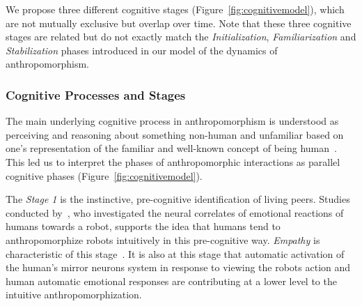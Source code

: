 \documentclass{frontiersSCNS} %
\begin{document}
We propose three different cognitive stages (Figure~\ref{fig:cognitivemodel}),
which are not mutually exclusive but overlap over time. Note that these three
cognitive stages are related but do not exactly match the \emph{Initialization},
\emph{Familiarization} and \emph{Stabilization} phases introduced in our model
of the dynamics of anthropomorphism.


\subsubsection{Cognitive Processes and Stages\\}

The main underlying cognitive process in anthropomorphism is understood as
perceiving and reasoning about something non-human and unfamiliar based on one's
representation of the familiar and well-known concept of being
human~\citep{epley_when_2008}. This led us to interpret the phases of
anthropomorphic interactions as parallel cognitive phases
(Figure~\ref{fig:cognitivemodel}).

The \emph{Stage 1} is the instinctive, pre-cognitive identification of living
peers. Studies conducted by~\citet{rosenthal-vonderputten_experimental_2013},
who investigated the neural correlates of emotional reactions of humans towards
a robot, supports the idea that humans tend to anthropomorphize robots
intuitively in this pre-cognitive way. {\it Empathy} is characteristic of this
stage~\citep{rosenthalvonderPutten2013neural}.  It is also at this stage that
automatic activation of the human's mirror neurons system  in response to
viewing the robots action and human automatic emotional responses are
contributing at a lower level to the intuitive anthropomorphization.
\end{document}
